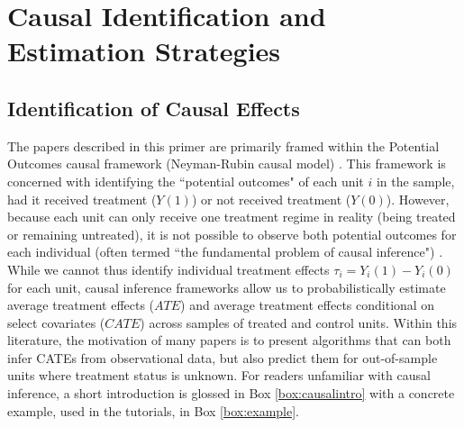 \section{Causal Identification and Estimation Strategies}
\label{section:CI}

\subsection{Identification of Causal Effects}

The papers described in this primer are primarily framed within the Potential Outcomes causal framework (Neyman-Rubin causal model) \citep{rubin1974estimating,imbens2015causal}. This framework is concerned with identifying the ``potential outcomes" of each unit $i$ in the sample, had it received treatment ($Y(1)$) or not received treatment ($Y(0)$). However, because each unit can only receive one treatment regime in reality (being treated or remaining untreated), it is not possible to observe both potential outcomes for each individual (often termed ``the fundamental problem of causal inference") \citep{holland1986statistics}. While we cannot thus identify individual treatment effects $\tau_i=Y_i(1)-Y_i(0)$ for each unit, causal inference frameworks allow us to probabilistically estimate average treatment effects ($ATE$) and average treatment effects conditional on select covariates ($CATE$) across samples of treated and control units. Within this literature, the motivation of many papers is to present algorithms that can both infer CATEs from observational data, but also predict them for out-of-sample units where treatment status is unknown. For readers unfamiliar with causal inference, a short introduction is glossed in Box \ref{box:causalintro} with a concrete example, used in the tutorials, in Box \ref{box:example}.

